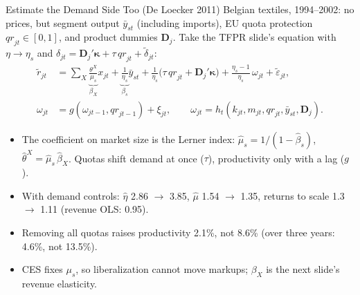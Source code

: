 \documentclass[aspectratio=169,10pt]{beamer}
\begin{document}
\begin{frame}{Estimate the Demand Side Too (De Loecker 2011)}
\small
Belgian textiles, 1994--2002: no prices, but segment output $\bar y_{st}$ (including imports), EU quota protection $\mathit{qr}_{jt} \in [0,1]$, and product dummies $\mathbf{D}_j$. Take the TFPR slide's equation with $\eta \to \eta_s$ and $\delta_{jt} = \mathbf{D}_j'\boldsymbol{\kappa} + \tau\,\mathit{qr}_{jt} + \tilde\delta_{jt}$:
\begin{align*}
\tilde r_{jt} &= \textstyle\sum_X \underbrace{\tfrac{\theta^X}{\mu_s}}_{\beta_X} x_{jt} + \underbrace{\tfrac{1}{\eta_s}}_{\beta_s} \bar y_{st} + \tfrac{1}{\eta_s}\big(\tau\,\mathit{qr}_{jt} + \mathbf{D}_j'\boldsymbol{\kappa}\big) + \tfrac{\eta_s - 1}{\eta_s}\,\omega_{jt} + \tilde\varepsilon_{jt}, \\
\omega_{jt} &= g(\omega_{jt-1}, \mathit{qr}_{jt-1}) + \xi_{jt}, \qquad \omega_{jt} = h_t(k_{jt}, m_{jt}, \mathit{qr}_{jt}, \bar y_{st}, \mathbf{D}_j).
\end{align*}
\begin{itemize}
\item The coefficient on market size is the Lerner index: $\hat\mu_s = 1/(1 - \hat\beta_s)$, $\hat\theta^X = \hat\mu_s\,\hat\beta_X$. Quotas shift demand at once ($\tau$), productivity only with a lag ($g$).
\item With demand controls: $\hat\eta$ 2.86 $\to$ 3.85, $\hat\mu$ 1.54 $\to$ 1.35, returns to scale 1.3 $\to$ 1.11 (revenue OLS: 0.95).
\item Removing all quotas raises productivity 2.1\%, not 8.6\% (over three years: 4.6\%, not 13.5\%).
\item CES fixes $\mu_s$, so liberalization cannot move markups; $\beta_X$ is the next slide's revenue elasticity.
\end{itemize}
\end{frame}
\end{document}
